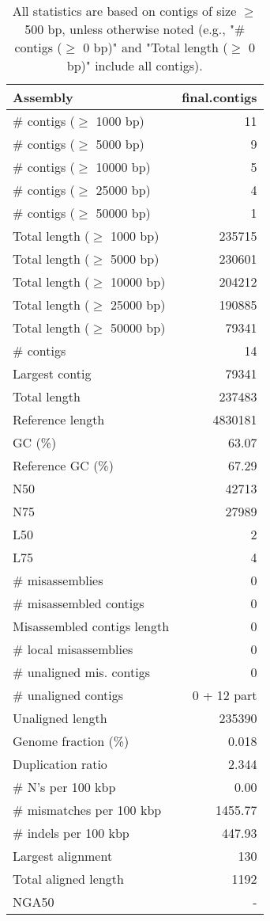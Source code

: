 \documentclass[12pt,a4paper]{article}
\begin{document}
\begin{table}[ht]
\begin{center}
\caption{All statistics are based on contigs of size $\geq$ 500 bp, unless otherwise noted (e.g., "\# contigs ($\geq$ 0 bp)" and "Total length ($\geq$ 0 bp)" include all contigs).}
\begin{tabular}{|l*{1}{|r}|}
\hline
Assembly & final.contigs \\ \hline
\# contigs ($\geq$ 1000 bp) & 11 \\ \hline
\# contigs ($\geq$ 5000 bp) & 9 \\ \hline
\# contigs ($\geq$ 10000 bp) & 5 \\ \hline
\# contigs ($\geq$ 25000 bp) & 4 \\ \hline
\# contigs ($\geq$ 50000 bp) & 1 \\ \hline
Total length ($\geq$ 1000 bp) & 235715 \\ \hline
Total length ($\geq$ 5000 bp) & 230601 \\ \hline
Total length ($\geq$ 10000 bp) & 204212 \\ \hline
Total length ($\geq$ 25000 bp) & 190885 \\ \hline
Total length ($\geq$ 50000 bp) & 79341 \\ \hline
\# contigs & 14 \\ \hline
Largest contig & 79341 \\ \hline
Total length & 237483 \\ \hline
Reference length & 4830181 \\ \hline
GC (\%) & 63.07 \\ \hline
Reference GC (\%) & 67.29 \\ \hline
N50 & 42713 \\ \hline
N75 & 27989 \\ \hline
L50 & 2 \\ \hline
L75 & 4 \\ \hline
\# misassemblies & 0 \\ \hline
\# misassembled contigs & 0 \\ \hline
Misassembled contigs length & 0 \\ \hline
\# local misassemblies & 0 \\ \hline
\# unaligned mis. contigs & 0 \\ \hline
\# unaligned contigs & 0 + 12 part \\ \hline
Unaligned length & 235390 \\ \hline
Genome fraction (\%) & 0.018 \\ \hline
Duplication ratio & 2.344 \\ \hline
\# N's per 100 kbp & 0.00 \\ \hline
\# mismatches per 100 kbp & 1455.77 \\ \hline
\# indels per 100 kbp & 447.93 \\ \hline
Largest alignment & 130 \\ \hline
Total aligned length & 1192 \\ \hline
NGA50 & - \\ \hline
\end{tabular}
\end{center}
\end{table}
\end{document}

